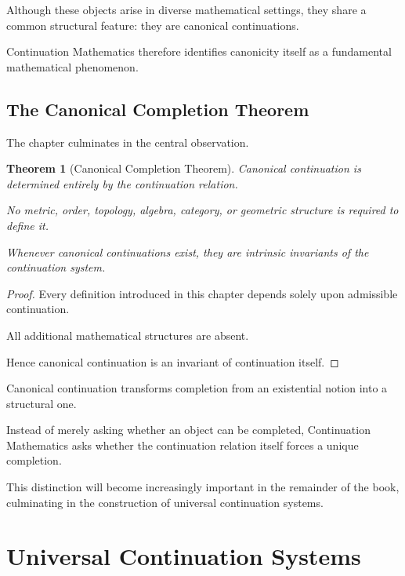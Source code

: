 \documentclass[13pt,openany]{book}
\theoremstyle{plain}
\newtheorem{theorem}{Theorem}[chapter]
\theoremstyle{definition}
\begin{document}
Although these objects arise in diverse mathematical settings, they share a
common structural feature: they are canonical continuations.

Continuation Mathematics therefore identifies canonicity itself as a fundamental
mathematical phenomenon.


\section{The Canonical Completion Theorem}

The chapter culminates in the central observation.

\begin{theorem}[Canonical Completion Theorem]
Canonical continuation is determined entirely by the continuation relation.

No metric,
order,
topology,
algebra,
category,
or geometric structure is required to define it.

Whenever canonical continuations exist, they are intrinsic invariants of the
continuation system.
\end{theorem}

\begin{proof}
Every definition introduced in this chapter depends solely upon admissible
continuation.

All additional mathematical structures are absent.

Hence canonical continuation is an invariant of continuation itself.
\end{proof}

Canonical continuation transforms completion from an existential notion into a
structural one.

Instead of merely asking whether an object can be completed, Continuation
Mathematics asks whether the continuation relation itself forces a unique
completion.

This distinction will become increasingly important in the remainder of the
book, culminating in the construction of universal continuation systems.

\chapter{Universal Continuation Systems}
\end{document}
